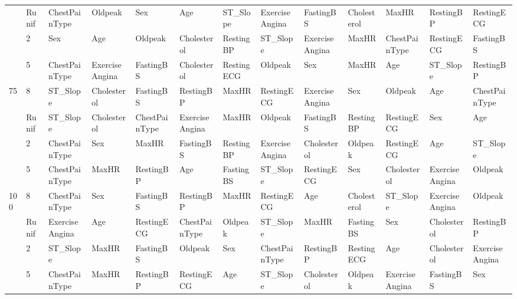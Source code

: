 \begin{table}[htbp]
\begin{tabular}{lllllllllllll}
 & Runif & ChestPainType & Oldpeak & Sex & Age & ST_Slope & ExerciseAngina & FastingBS & Cholesterol & MaxHR & RestingBP & RestingECG \\
 & 2 & Sex & Age & Oldpeak & Cholesterol & RestingBP & ST_Slope & ExerciseAngina & MaxHR & ChestPainType & RestingECG & FastingBS \\
 & 5 & ChestPainType & ExerciseAngina & FastingBS & Cholesterol & RestingECG & Oldpeak & Sex & MaxHR & Age & ST_Slope & RestingBP \\
\multirow[c]{4}{*}{75} & 8 & ST_Slope & Cholesterol & FastingBS & RestingBP & MaxHR & RestingECG & ExerciseAngina & Sex & Oldpeak & Age & ChestPainType \\
 & Runif & ST_Slope & Cholesterol & ChestPainType & ExerciseAngina & MaxHR & Oldpeak & FastingBS & RestingBP & RestingECG & Sex & Age \\
 & 2 & ChestPainType & Sex & MaxHR & FastingBS & RestingBP & ExerciseAngina & Cholesterol & Oldpeak & RestingECG & Age & ST_Slope \\
 & 5 & ChestPainType & MaxHR & RestingBP & Age & FastingBS & ST_Slope & RestingECG & Sex & Cholesterol & ExerciseAngina & Oldpeak \\
\multirow[c]{4}{*}{100} & 8 & ChestPainType & Sex & FastingBS & RestingBP & MaxHR & RestingECG & Age & Cholesterol & ST_Slope & ExerciseAngina & Oldpeak \\
 & Runif & ExerciseAngina & Age & RestingECG & ChestPainType & Oldpeak & ST_Slope & MaxHR & FastingBS & Sex & Cholesterol & RestingBP \\
 & 2 & ST_Slope & MaxHR & FastingBS & Oldpeak & Sex & ChestPainType & RestingBP & RestingECG & Age & Cholesterol & ExerciseAngina \\
 & 5 & ChestPainType & MaxHR & RestingBP & RestingECG & Age & ST_Slope & Cholesterol & Oldpeak & ExerciseAngina & FastingBS & Sex \\
\bottomrule
\end{tabular}
\end{table}
